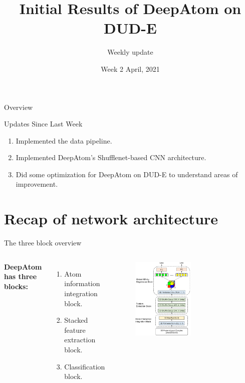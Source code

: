 \documentclass[aspectratio=169,xcolor=dvipsnames]{beamer}
\title[DeepAtom]{Initial Results of DeepAtom on DUD-E}
\subtitle{Weekly update}
\date{Week 2 April, 2021}
\begin{document}
\begin{frame}
    \titlepage
\end{frame}

\begin{frame}{Overview}
    \tableofcontents
\end{frame}

\begin{frame}{Updates Since Last Week}
    \begin{enumerate}
        \item Implemented the data pipeline.
        \item Implemented DeepAtom's Shufflenet-based CNN 
        architecture.
        \item Did some optimization for DeepAtom on DUD-E to 
        understand areas of improvement.
    \end{enumerate}
\end{frame}

\section{Recap of network architecture}
\begin{frame}{The three block overview}
    \begin{columns}[c]
        \textbf{DeepAtom has three blocks:}
        \begin{enumerate}
            \item Atom information integration block.
            \item Stacked feature extraction block.
            \item Classification block.
        \end{enumerate}
        \begin{figure}
            \includegraphics[width=0.55\textwidth]{images/network_left}
        \end{figure}
    \end{columns}
\end{frame}
\end{document}
